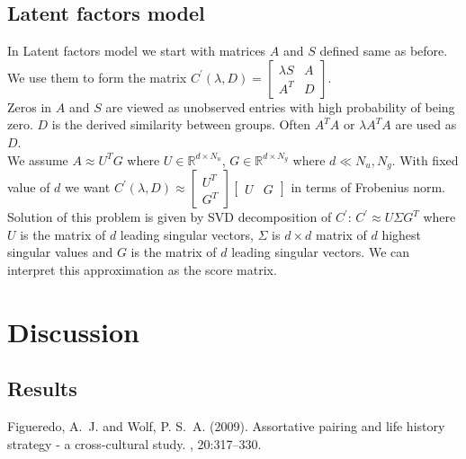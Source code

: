 \documentclass[twoside,twocolumn]{article}
\begin{document}
\subsection{Latent factors model}

In Latent factors model we start with matrices $A$ and $S$ defined same as before. We use them to form the matrix
$ C^\prime (\lambda, D) = \begin{bmatrix} \lambda S & A\\ A^T & D \end{bmatrix} $. \\
Zeros in $A$ and $S$ are viewed as unobserved entries with high probability of being zero. $D$ is the derived similarity between groups. Often $A^TA$ or $\lambda A^TA$ are used as $D$. \\
We assume $A \approx U^T G$ where $U \in \mathbb{R}^{d \times N_u}$, $G \in \mathbb{R}^{d \times N_g}$ where $d \ll N_u, N_g$. With fixed value of $d$ we want $C^\prime (\lambda, D) \approx \begin{bmatrix} U^T\\ G^T \end{bmatrix}\begin{bmatrix}U&G \end{bmatrix}$ in terms of Frobenius norm. \\
Solution of this problem is given by SVD decomposition of $C^\prime$: $C^\prime \approx U \Sigma G^T$ where $U$ is the matrix of $d$ leading singular vectors, $\Sigma$ is $d \times d$ matrix of $d$ highest singular values and $G$ is the matrix of $d$ leading singular vectors. We can interpret this approximation as the score matrix.


\section{Discussion}

\subsection{Results}



\begin{thebibliography}{99} %

Figueredo, A.~J. and Wolf, P. S.~A. (2009).
\newblock Assortative pairing and life history strategy - a cross-cultural
  study.
, 20:317--330.

\end{thebibliography}

\end{document}

